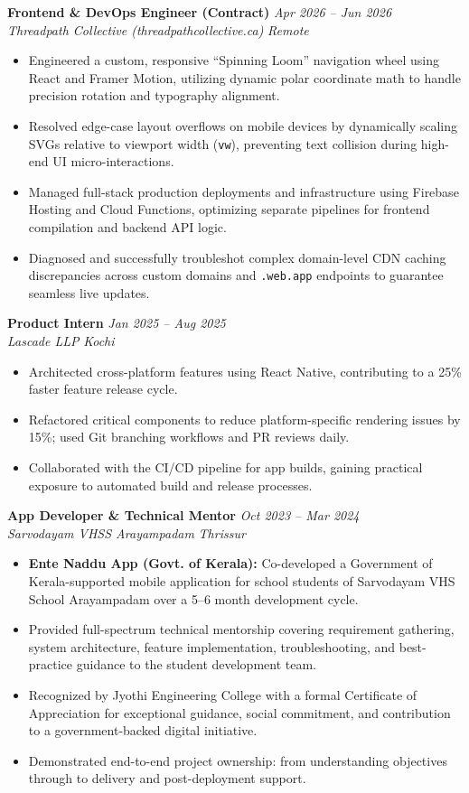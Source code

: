 \documentclass[10pt,a4paper]{article}
\newcommand{\jobheading}[4]{
  \noindent\textbf{#1} \hfill \textit{#2} \\
  \noindent\textit{#3} \hfill \textit{#4} \\
  \vspace{-4pt}
}
\begin{document}
\jobheading{Frontend \& DevOps Engineer (Contract)}{Apr 2026 -- Jun 2026}{Threadpath Collective (threadpathcollective.ca)}{Remote}
\begin{itemize}[label={$\bullet$}]
    \item Engineered a custom, responsive ``Spinning Loom'' navigation wheel using React and Framer Motion, utilizing dynamic polar coordinate math to handle precision rotation and typography alignment.
    \item Resolved edge-case layout overflows on mobile devices by dynamically scaling SVGs relative to viewport width (\texttt{vw}), preventing text collision during high-end UI micro-interactions.
    \item Managed full-stack production deployments and infrastructure using Firebase Hosting and Cloud Functions, optimizing separate pipelines for frontend compilation and backend API logic.
    \item Diagnosed and successfully troubleshot complex domain-level CDN caching discrepancies across custom domains and \texttt{.web.app} endpoints to guarantee seamless live updates.
\end{itemize}

\vspace{5pt}

\jobheading{Product Intern}{Jan 2025 -- Aug 2025}{Lascade LLP}{Kochi}
\begin{itemize}[label={$\bullet$}]
    \item Architected cross-platform features using React Native, contributing to a 25\% faster feature release cycle.
    \item Refactored critical components to reduce platform-specific rendering issues by 15\%; used Git branching workflows and PR reviews daily.
    \item Collaborated with the CI/CD pipeline for app builds, gaining practical exposure to automated build and release processes.
\end{itemize}

\vspace{100pt}

\jobheading{App Developer \& Technical Mentor}{Oct 2023 -- Mar 2024}{Sarvodayam VHSS Arayampadam}{Thrissur}
\begin{itemize}[label={$\bullet$}]
    \item \textbf{Ente Naddu App (Govt. of Kerala):} Co-developed a Government of Kerala-supported mobile application for school students of Sarvodayam VHS School Arayampadam over a 5--6 month development cycle.
    \item Provided full-spectrum technical mentorship covering requirement gathering, system architecture, feature implementation, troubleshooting, and best-practice guidance to the student development team.
    \item Recognized by Jyothi Engineering College with a formal Certificate of Appreciation for exceptional guidance, social commitment, and contribution to a government-backed digital initiative.
    \item Demonstrated end-to-end project ownership: from understanding objectives through to delivery and post-deployment support.
\end{itemize}
\end{document}
